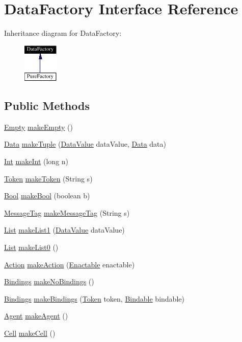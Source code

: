 \hypertarget{interfaceDataFactory}{
\section{Data\-Factory  Interface Reference}
\label{interfaceDataFactory}
}
Inheritance diagram for Data\-Factory:\begin{figure}[H]
\begin{center}
\leavevmode
\includegraphics[width=47pt]{interfaceDataFactory__inherit__graph}
\end{center}
\end{figure}
\subsection*{Public Methods}
\begin{CompactItemize}
\item 
\hyperlink{interfaceEmpty}{Empty} \hyperlink{interfaceDataFactory_a0}{make\-Empty} ()
\item 
\hyperlink{interfaceData}{Data} \hyperlink{interfaceDataFactory_a1}{make\-Tuple} (\hyperlink{interfaceDataValue}{Data\-Value} data\-Value, \hyperlink{interfaceData}{Data} data)
\item 
\hyperlink{interfaceInt}{Int} \hyperlink{interfaceDataFactory_a2}{make\-Int} (long n)
\item 
\hyperlink{interfaceToken}{Token} \hyperlink{interfaceDataFactory_a3}{make\-Token} (String s)
\item 
\hyperlink{interfaceBool}{Bool} \hyperlink{interfaceDataFactory_a4}{make\-Bool} (boolean b)
\item 
\hyperlink{interfaceMessageTag}{Message\-Tag} \hyperlink{interfaceDataFactory_a5}{make\-Message\-Tag} (String s)
\item 
\hyperlink{interfaceList}{List} \hyperlink{interfaceDataFactory_a6}{make\-List1} (\hyperlink{interfaceDataValue}{Data\-Value} data\-Value)
\item 
\hyperlink{interfaceList}{List} \hyperlink{interfaceDataFactory_a7}{make\-List0} ()
\item 
\hyperlink{interfaceAction}{Action} \hyperlink{interfaceDataFactory_a8}{make\-Action} (\hyperlink{interfaceEnactable}{Enactable} enactable)
\item 
\hyperlink{interfaceBindings}{Bindings} \hyperlink{interfaceDataFactory_a9}{make\-No\-Bindings} ()
\item 
\hyperlink{interfaceBindings}{Bindings} \hyperlink{interfaceDataFactory_a10}{make\-Bindings} (\hyperlink{interfaceToken}{Token} token, \hyperlink{interfaceBindable}{Bindable} bindable)
\item 
\hyperlink{interfaceAgent}{Agent} \hyperlink{interfaceDataFactory_a11}{make\-Agent} ()
\item 
\hyperlink{interfaceCell}{Cell} \hyperlink{interfaceDataFactory_a12}{make\-Cell} ()
\end{CompactItemize}


